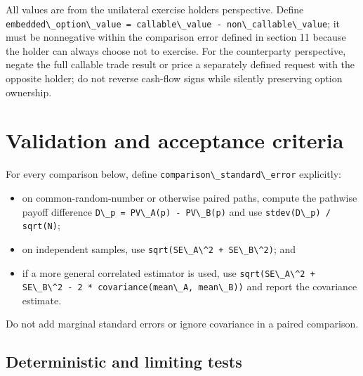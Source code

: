 \documentclass[conference]{IEEEtran}
\newcommand{\passthrough}[1]{#1}
\providecommand{\tightlist}{}
\begin{document}
All values are from the unilateral exercise holder\textquotesingle s
perspective. Define
\passthrough{\lstinline!embedded\_option\_value = callable\_value - non\_callable\_value!};
it must be nonnegative within the comparison error defined in section 11
because the holder can always choose not to exercise. For the
counterparty perspective, negate the full callable trade result or price
a separately defined request with the opposite holder; do not reverse
cash-flow signs while silently preserving option ownership.

\section{Validation and acceptance
criteria}\label{11-validation-and-acceptance-criteria}

For every comparison below, define
\passthrough{\lstinline!comparison\_standard\_error!} explicitly:

\begin{itemize}
\tightlist
\item
  on common-random-number or otherwise paired paths, compute the
  pathwise payoff difference
  \passthrough{\lstinline!D\_p = PV\_A(p) - PV\_B(p)!} and use
  \passthrough{\lstinline!stdev(D\_p) / sqrt(N)!};
\item
  on independent samples, use
  \passthrough{\lstinline!sqrt(SE\_A\^2 + SE\_B\^2)!}; and
\item
  if a more general correlated estimator is used, use
  \passthrough{\lstinline!sqrt(SE\_A\^2 + SE\_B\^2 - 2 * covariance(mean\_A, mean\_B))!}
  and report the covariance estimate.
\end{itemize}

Do not add marginal standard errors or ignore covariance in a paired
comparison.

\subsection{Deterministic and limiting
tests}\label{111-deterministic-and-limiting-tests}
\end{document}
